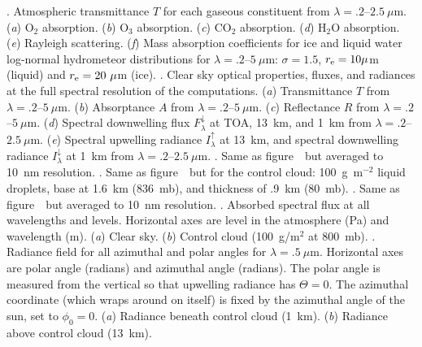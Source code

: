 \nopagenumbers
\baselineskip=14pt
%
\bigskip
\vbox{
.
Atmospheric transmittance $T$ for each gaseous
constituent from $\lambda = .2$--$2.5~\mu$m.
({\it a\/}) O$_2$ absorption.
({\it b\/}) O$_3$ absorption.
({\it c\/}) CO$_2$ absorption.
({\it d\/}) H$_2$O absorption.
({\it e\/}) Rayleigh scattering.
({\it f\/}) Mass absorption coefficients for ice and liquid water
log-normal hydrometeor distributions for $\lambda = .2$--$5~\mu$m:
$\sigma = 1.5$, $r_{\rm e} = 10 \mu$m (liquid) and  $r_{\rm e} =
20~\mu$m (ice). 
}
%
\bigskip
\vbox{
.
Clear sky optical properties, fluxes, and radiances at the full
spectral resolution of the computations.
({\it a\/}) Transmittance $T$ from $\lambda = .2$--$5~\mu$m.
({\it b\/}) Absorptance $A$ from $\lambda = .2$--$5~\mu$m.
({\it c\/}) Reflectance $R$ from $\lambda = .2$--$5~\mu$m.
({\it d\/}) Spectral downwelling flux $F^\downarrow_\lambda$ at TOA,
13~km, and 1~km from $\lambda = .2$--$2.5~\mu$m.
({\it e\/}) Spectral upwelling radiance $I^\uparrow_\lambda$ at 13~km,
and spectral downwelling radiance $I^\downarrow_\lambda$ at 1~km from $\lambda = .2$--$2.5~\mu$m.
}
%
\bigskip
\vbox{
.
Same as figure~\ but averaged to 10~nm resolution.
}
%
\bigskip
\vbox{
.
Same as figure~\ but for the control cloud:
100~g~m$^{-2}$ liquid droplets, base at 1.6~km (836~mb), and thickness
of .9~km (80~mb).
}
%
\bigskip
\vbox{
.
Same as figure~\ but averaged to 10~nm resolution.
}
%
\bigskip
\vbox{
.
Absorbed spectral flux at all wavelengths and levels.
Horizontal axes are level in the atmosphere (Pa) and wavelength (m). 
({\it a\/}) Clear sky.
({\it b\/}) Control cloud (100~g/m$^2$ at 800~mb).
}
%
\bigskip
\vbox{
.
Radiance field for all azimuthal and polar angles for $\lambda =
.5~\mu$m. 
Horizontal axes are polar angle (radians) and azimuthal angle
(radians). The polar angle is measured from the vertical so that
upwelling radiance has $\Theta = 0$.
The azimuthal coordinate (which wraps around on itself) is fixed by
the azimuthal angle of the sun, set to $\phi_0 = 0$.
({\it a\/}) Radiance beneath control cloud (1~km).
({\it b\/}) Radiance above control cloud (13~km).
}
